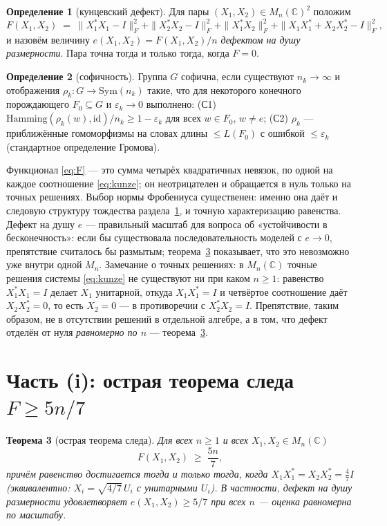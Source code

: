 \documentclass[11pt,a4paper]{article}
\theoremstyle{plain}
\newtheorem{theorem}{Теорема}[section]
\theoremstyle{definition}
\newtheorem{definition}[theorem]{Определение}
\theoremstyle{remark}
\begin{document}
\begin{definition}[кунцевский дефект]\label{def:defect}
Для пары $(X_1,X_2)\in M_n(\mathbb{C})^2$ положим
\begin{equation}
F(X_1,X_2) \;=\; \|X_1^*X_1-I\|_F^2 + \|X_2^*X_2-I\|_F^2
+ \|X_1^*X_2\|_F^2 + \|X_1X_1^*+X_2X_2^*-I\|_F^2,
\label{eq:F}
\end{equation}
и назовём величину $e(X_1,X_2) = F(X_1,X_2)/n$ \emph{дефектом на душу
размерности}. Пара точна тогда и только тогда, когда $F=0$.
\end{definition}

\begin{definition}[софичность]\label{def:sofic}
Группа $G$ софична, если существуют $n_k\to\infty$ и отображения
$\rho_k\colon G\to\mathrm{Sym}(n_k)$ такие, что для некоторого конечного
порождающего $F_0\subseteq G$ и $\varepsilon_k\to 0$ выполнено:
(С1) $\mathrm{Hamming}(\rho_k(w),\mathrm{id})/n_k\ge 1-\varepsilon_k$
для всех $w\in F_0$, $w\ne e$; (С2) $\rho_k$ — приближённые
гомоморфизмы на словах длины $\le L(F_0)$ с ошибкой $\le\varepsilon_k$
(стандартное определение Громова).
\end{definition}

Функционал \eqref{eq:F} — это сумма четырёх квадратичных невязок,
по одной на каждое соотношение \eqref{eq:kunze}; он неотрицателен и
обращается в нуль только на точных решениях. Выбор нормы Фробениуса
существенен: именно она даёт и следовую структуру тождества
раздела~\ref{sec:sharp}, и точную характеризацию равенства. Дефект на
душу $e$ — правильный масштаб для вопроса об «устойчивости в
бесконечность»: если бы существовала последовательность моделей с
$e\to 0$, препятствие считалось бы размытым; теорема~\ref{th:sharp}
показывает, что это невозможно уже внутри одной $M_n$. Замечание о
точных решениях: в $M_n(\mathbb{C})$ точные решения системы
\eqref{eq:kunze} не существуют ни при каком $n\ge 1$: равенство
$X_1^*X_1=I$ делает $X_1$ унитарной, откуда $X_1X_1^*=I$ и четвёртое
соотношение даёт $X_2X_2^*=0$, то есть $X_2=0$ — в противоречии с
$X_2^*X_2=I$. Препятствие, таким образом, не в отсутствии решений в
отдельной алгебре, а в том, что дефект отделён от нуля \emph{равномерно
по $n$} — теорема~\ref{th:sharp}.

\section{Часть (i): острая теорема следа $F\ge 5n/7$}\label{sec:sharp}

\begin{theorem}[острая теорема следа]\label{th:sharp}
Для всех $n\ge 1$ и всех $X_1,X_2\in M_n(\mathbb{C})$
\[
F(X_1,X_2)\;\ge\;\frac{5n}{7},
\]
причём равенство достигается тогда и только тогда, когда
$X_1X_1^*=X_2X_2^*=\tfrac47 I$ (эквивалентно:
$X_i=\sqrt{4/7}\,U_i$ с унитарными $U_i$). В частности, дефект на душу
размерности удовлетворяет $e(X_1,X_2)\ge 5/7$ при всех $n$ — оценка
равномерна по масштабу.
\end{theorem}
\end{document}
